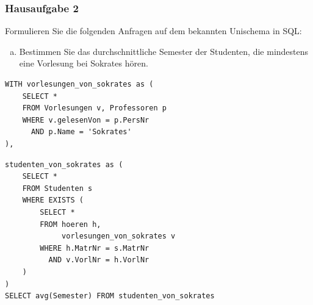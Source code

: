 \begin{frame}[fragile]
	\frametitle{Hausaufgabe 2}
	\vspace{0.25cm}

	\begin{multicols}{2}
		Formulieren Sie die folgenden Anfragen auf dem bekannten Unischema in SQL:
		\begin{enumerate}[a)]
			\item Bestimmen Sie das durchschnittliche Semester der Studenten, die mindestens eine Vorlesung bei Sokrates hören.
		\end{enumerate}
		\begin{verbatim}
WITH vorlesungen_von_sokrates as (
	SELECT * 
	FROM Vorlesungen v, Professoren p
	WHERE v.gelesenVon = p.PersNr
	  AND p.Name = 'Sokrates'
),
		\end{verbatim}
		\vfill\columnbreak

		\begin{verbatim}
studenten_von_sokrates as (
	SELECT * 
	FROM Studenten s
	WHERE EXISTS (
		SELECT *
		FROM hoeren h, 
		     vorlesungen_von_sokrates v
		WHERE h.MatrNr = s.MatrNr
		  AND v.VorlNr = h.VorlNr
	)
)
SELECT avg(Semester) FROM studenten_von_sokrates
		\end{verbatim}
	\end{multicols}
\end{frame}

